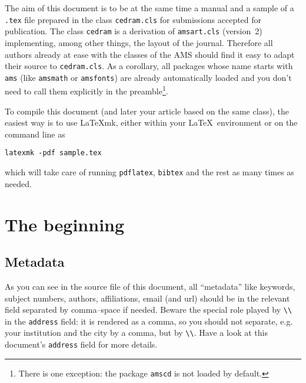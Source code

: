\documentclass[IGT,Unicode]{cedram}
\title
[A \textup{(}useful?\textup{)} guide for authors]
{A guide for authors preparing their accepted manuscript for IGT}
\author[\initial{J.} Fourier]{\firstname{Joseph} \lastname{Fourier}}
\author[\initial{M.} \middlename{X.} Mersenne]{\firstname{Marin} \middlename{X.} \lastname{Mersenne}}
\begin{document}
\begin{abstract}
  Here is the abstract, which is short but nevertheless useful.
\end{abstract}

\maketitle

The aim of this document is to be at the same time a manual and a
sample of a \verb|.tex| file prepared in the class
\verb|cedram.cls| for submissions accepted for publication. The
class \verb|cedram| is a derivation of \verb|amsart.cls|
(version~2) implementing, among other things, the layout of the journal. Therefore all
authors already at ease with the classes of the AMS should find it
easy to adapt their source to \verb|cedram.cls|. As a
corollary, all packages whose name starts with \verb|ams| (like
\verb|amsmath| or \verb|amsfonts|) are already automatically loaded
and you don't need to call them explicitly in the
preamble\footnote{There is one exception: the package \texttt{amscd}
  is not loaded by default.}.

To compile this document (and later your article based on the same class), the
easiest way is to use LaTeXmk, either within your \LaTeX\ environment or on the
command line as
\begin{verbatim}
latexmk -pdf sample.tex
\end{verbatim}
which will take care of running \verb|pdflatex|, \verb|bibtex| and the rest as
many times as needed.

\section{The beginning}

\subsection{Metadata}

As you can see in the source file of this document, all ``metadata''
like keywords, subject numbers, authors, affiliations, email (and url)
should be in the relevant field separated by comma--space if
needed. Beware the special role played by \verb|\\| in the
\verb|address| field: it is rendered as a comma, so you should not
separate, e.g. your institution and the city by a comma, but by
\verb|\\|. Have a look at this document's \verb|address| field for
more details.
\end{document}
